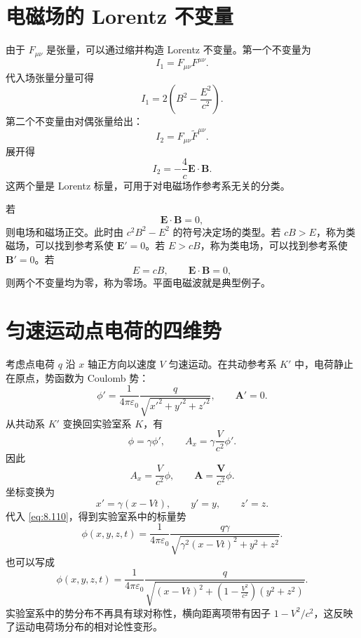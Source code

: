\section{电磁场的 Lorentz 不变量}

由于 $F_{\mu\nu}$ 是张量，可以通过缩并构造 Lorentz 不变量。第一个不变量为
\begin{equation}
	I_{1}=F_{\mu\nu}F^{\mu\nu}.
	\label{eq:8.104}
\end{equation}
代入场张量分量可得
\begin{equation}
	I_{1}
	=
	2\left(B^{2}-\frac{E^{2}}{c^{2}}\right).
	\label{eq:8.105}
\end{equation}
第二个不变量由对偶张量给出：
\begin{equation}
	I_{2}=F_{\mu\nu}\widetilde{F}^{\mu\nu}.
	\label{eq:8.106}
\end{equation}
展开得
\begin{equation}
	I_{2}
	=
	-\frac{4}{c}\bm{E}\cdot\bm{B}.
	\label{eq:8.107}
\end{equation}
这两个量是 Lorentz 标量，可用于对电磁场作参考系无关的分类。

若
\[
\bm{E}\cdot\bm{B}=0,
\]
则电场和磁场正交。此时由 $c^{2}B^{2}-E^{2}$ 的符号决定场的类型。若 $cB>E$，称为类磁场，可以找到参考系使 $\bm{E}'=0$。若 $E>cB$，称为类电场，可以找到参考系使 $\bm{B}'=0$。若
\[
E=cB,
\qquad
\bm{E}\cdot\bm{B}=0,
\]
则两个不变量均为零，称为零场。平面电磁波就是典型例子。

\section{匀速运动点电荷的四维势}

考虑点电荷 $q$ 沿 $x$ 轴正方向以速度 $V$ 匀速运动。在共动参考系 $K'$ 中，电荷静止在原点，势函数为 Coulomb 势：
\begin{equation}
	\phi'
	=
	\frac{1}{4\pi\varepsilon_{0}}
	\frac{q}{\sqrt{x'^{2}+y'^{2}+z'^{2}}},
	\qquad
	\bm{A}'=0.
	\label{eq:8.110}
\end{equation}
从共动系 $K'$ 变换回实验室系 $K$，有
\[
\phi=\gamma\phi',
\qquad
A_{x}=\gamma\frac{V}{c^{2}}\phi'.
\]
因此
\begin{equation}
	A_{x}=\frac{V}{c^{2}}\phi,
	\qquad
	\bm{A}=\frac{\bm{V}}{c^{2}}\phi.
	\label{eq:8.112}
\end{equation}
坐标变换为
\[
x'=\gamma(x-Vt),
\qquad
y'=y,
\qquad
z'=z.
\]
代入 \eqref{eq:8.110}，得到实验室系中的标量势
\[
\phi(x,y,z,t)
=
\frac{1}{4\pi\varepsilon_{0}}
\frac{q\gamma}
{\sqrt{\gamma^{2}(x-Vt)^{2}+y^{2}+z^{2}}}.
\]
也可以写成
\begin{equation}
	\phi(x,y,z,t)
	=
	\frac{1}{4\pi\varepsilon_{0}}
	\frac{q}
	{\sqrt{(x-Vt)^{2}+
			\left(1-\frac{V^{2}}{c^{2}}\right)(y^{2}+z^{2})}}.
	\label{eq:8.115}
\end{equation}
实验室系中的势分布不再具有球对称性，横向距离项带有因子 $1-V^{2}/c^{2}$，这反映了运动电荷场分布的相对论性变形。

